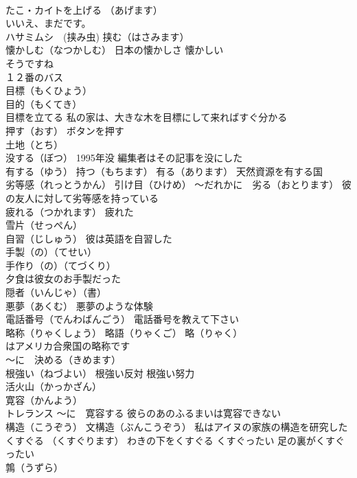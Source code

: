 \documentclass[8pt]{extreport}
\begin{document}
\begin{CJK}{UTF8}{min}
\\	たこ・カイトを上げる （あげます）
\\	いいえ、まだです。
\\	ハサミムシ　(挟み虫) 挟む（はさみます）
\\	懐かしむ（なつかしむ） 日本の懐かしさ 懐かしい
\\	そうですね
\\	１２番のバス
\\	目標（もくひょう） 
\\	目的（もくてき）
\\	目標を立てる 私の家は、大きな木を目標にして来ればすぐ分かる
\\	押す（おす） ボタンを押す
\\	土地（とち）
\\	没する（ぼつ） 1995年没 編集者はその記事を没にした
\\	有する（ゆう） 持つ（もちます） 有る（あります） 天然資源を有する国
\\	劣等感（れっとうかん） 引け目（ひけめ） ～だれかに　劣る（おとります） 彼の友人に対して劣等感を持っている
\\	疲れる（つかれます） 疲れた
\\	雪片（せっぺん）
\\	自習（じしゅう） 彼は英語を自習した
\\	手製（の）（てせい） 
\\	手作り（の）（てづくり） 
\\	夕食は彼女のお手製だった
\\	隠者（いんじゃ）（書）
\\	悪夢（あくむ） 悪夢のような体験
\\	電話番号（でんわばんごう） 電話番号を教えて下さい
\\	略称（りゃくしょう） 略語（りゃくご） 略（りゃく） 
\\	はアメリカ合衆国の略称です
\\	～に　決める（きめます）
\\	根強い（ねづよい） 根強い反対 根強い努力
\\	活火山（かっかざん）
\\	寛容（かんよう）
\\	トレランス ～に　寛容する 彼らのあのふるまいは寛容できない
\\	構造（こうぞう） 文構造（ぶんこうぞう） 私はアイヌの家族の構造を研究した
\\	くすぐる （くすぐります） わきの下をくすぐる くすぐったい 足の裏がくすぐったい
\\	鶉（うずら）

\end{CJK}
\end{document}
